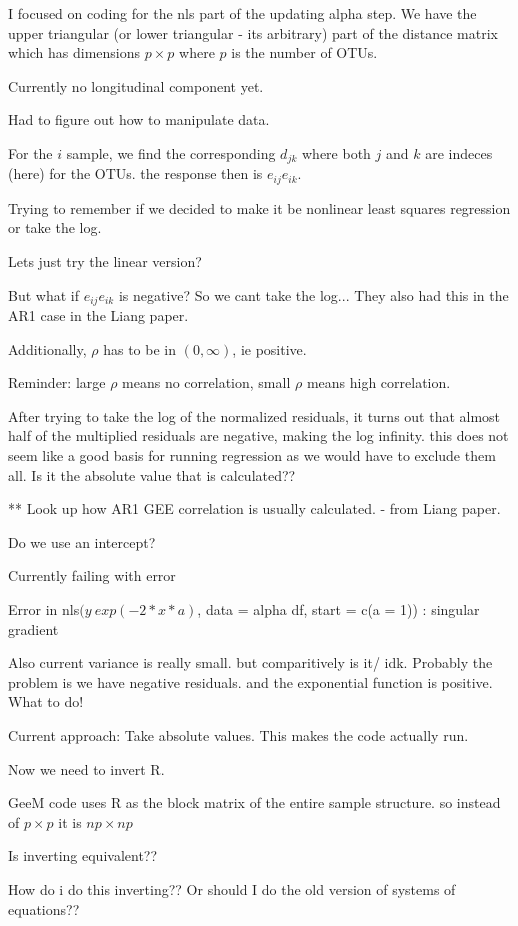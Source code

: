 \documentclass[10pt]{article}
\begin{document}
I focused on coding for the nls part of the updating alpha step. We have the upper triangular (or lower triangular - its arbitrary) part of the distance matrix which has dimensions $p \times p$ where $p$ is the number of OTUs.

Currently no longitudinal component yet.

Had to figure out how to manipulate data.

For the $i$ sample, we find the corresponding $d_{jk}$ where both $j$ and  $k$ are indeces (here) for the OTUs. the response then is $e_{ij}e_{ik}$.

Trying to remember if we decided to make it be nonlinear least squares regression or take the log.

Lets just try the linear version?

But what if $e_{ij}e_{ik}$ is negative? So we cant take the log... They also had this in the AR1 case in the Liang paper.

Additionally, $\rho$ has to be in $(0,\infty)$, ie positive.

Reminder: large $\rho$ means no correlation, small $\rho$ means high correlation.

After trying to take the log of the normalized residuals, it turns out that almost half of the multiplied residuals are negative, making the log infinity. this does not seem like a good basis for running regression as we would have to exclude them all. Is it the absolute value that is calculated??

** Look up how AR1 GEE correlation is usually calculated. - from Liang paper.

Do we use an intercept?

Currently failing with error

Error in nls$(y ~ exp(-2 * x * a)$, data = alpha df, start = c(a = 1)) :
  singular gradient

Also current variance is really small. but comparitively is it/ idk.
Probably the problem is we have negative residuals. and the exponential function is positive. What to do!

Current approach: Take absolute values. This makes the code actually run.

Now we need to invert R.

GeeM code uses R as the block matrix of the entire sample structure. so instead of $p \times p$ it is $np \times np$

Is inverting equivalent??

How do i do this inverting??
Or should I do the old version of systems of equations??
\end{document}
